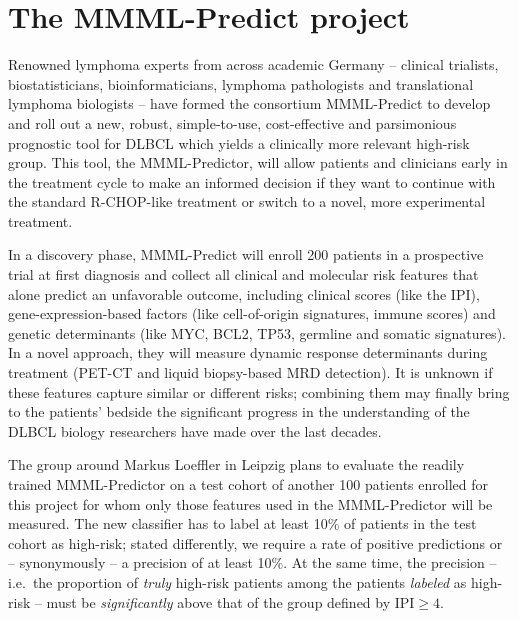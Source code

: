 \section{The MMML-Predict project} \label{sec:intro-mmml}

Renowned lymphoma experts from across academic Germany -- clinical trialists, biostatisticians, 
bioinformaticians, lymphoma pathologists and translational lymphoma biologists -- have formed the 
consortium MMML-Predict to develop and roll out a new, robust, simple-to-use, cost-effective and 
parsimonious prognostic tool for DLBCL 
which yields a clinically more relevant high-risk group. This tool, the MMML-Predictor, will allow 
patients and clinicians early in the treatment cycle to make an informed decision if they want to 
continue with the standard R-CHOP-like treatment or switch to a novel, more experimental treatment. 

In a discovery phase, MMML-Predict will enroll \num{200} patients in a prospective trial at first 
diagnosis and 
collect all clinical and molecular risk features that alone predict an unfavorable outcome, 
including clinical scores (like the IPI), gene-expression-based factors (like cell-of-origin 
signatures, immune scores) and genetic determinants (like MYC, BCL2, TP53, germline and somatic 
signatures).
In a novel approach, they will measure dynamic response determinants during treatment (PET-CT 
and liquid biopsy-based MRD detection). It is unknown if these features capture similar or different 
risks; combining them may finally bring to the patients' bedside the significant progress in the 
understanding of the DLBCL biology researchers have made over the last decades.

The group around Markus Loeffler in Leipzig plans to evaluate the readily trained MMML-Predictor on 
a test cohort of another \num{100} patients enrolled for this project for whom only those features 
used in the MMML-Predictor will be measured. The new classifier has to label at least \num{10}\% of 
patients in the test cohort as high-risk; stated differently, we require a rate of positive 
predictions or -- synonymously -- a precision of at least \num{10}\%. At the same time, the 
precision -- i.e.\ the proportion of \textit{truly} high-risk patients among the patients 
\textit{labeled} as high-risk -- must be \textit{significantly} above that of the group defined by
$\text{IPI} \geq 4$. 

